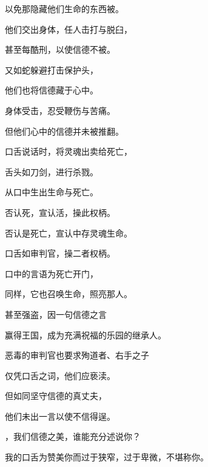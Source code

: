 以免那隐藏他们生命的东西被。\par

他们交出身体，任人击打与脱臼，\par

甚至每酷刑，以使信德不被。\par

又如蛇躲避打击保护头，\par

他们也将信德藏于心中。\par

身体受击，忍受鞭伤与苦痛。\par

但他们心中的信德并未被推翻。\par

口舌说话时，将灵魂出卖给死亡，\par

舌头如刀剑，进行杀戮。\par

从口中生出生命与死亡。\par

否认死，宣认活，操此权柄。\par

否认是死亡，宣认中存灵魂生命。\par

口舌如审判官，操二者权柄。\par

口中的言语为死亡开门，\par

同样，它也召唤生命，照亮那人。\par

甚至强盗，因一句信德之言\par

赢得王国，成为充满祝福的乐园的继承人。\par

恶毒的审判官也要求殉道者、右手之子\par

仅凭口舌之词，他们应亵渎。\par

但如同坚守信德的真丈夫，\par

他们未出一言以使不信得逞。\par

，我们信德之美，谁能充分述说你？\par

我的口舌为赞美你而过于狭窄，过于卑微，不堪称你。\par

